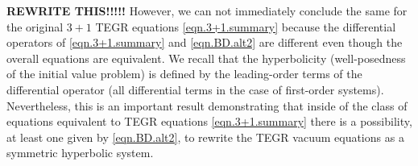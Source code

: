 \documentclass[
10pt, %
a4paper, %
oneside, %
twocolumn,
headinclude,footinclude, %
BCOR5mm, %
]{scrartcl}
\newcommand{\pd}[1]{\partial_{#1}}
\newcommand{\Hfin}[2]{\mathtt{H}_{#2#1}}	%
\newcommand{\Hfinnmix}[2]{\hat{\mathtt{H}}^{#2}_{\ #1}}	%
\newcommand{\Efin}[2]{\mathtt{E}^{#1}_{\phantom{#1}#2}}	%
\newcommand{\Efinn}[2]{\hat{\mathtt{E}}^{#1}_{\ #2}}	%
\newcommand{\indalg}[1]{\hat{\mathsmaller{#1}}}
\begin{document}
	\textbf{REWRITE THIS!!!!!}  However, we can not immediately conclude 
	the same for the original $ 3+1 $ TEGR equations \eqref{eqn.3+1.summary} because the 
	differential 
	operators 
	of 
	\eqref{eqn.3+1.summary} and \eqref{eqn.BD.alt2} are different even though the overall equations 
	are 
	equivalent. We recall that the hyperbolicity (well-posedness of the initial value problem) is 
	defined by the leading-order terms of the differential operator (all differential terms in the 
	case 
	of first-order systems). Nevertheless, this is an important result demonstrating that inside of 
	the 
	class of equations equivalent to TEGR equations \eqref{eqn.3+1.summary} there is a 
	possibility, at least one given by \eqref{eqn.BD.alt2},  to rewrite the TEGR vacuum equations 
	as a 
	symmetric 
	hyperbolic system.
	
	
	
	
\end{document}
